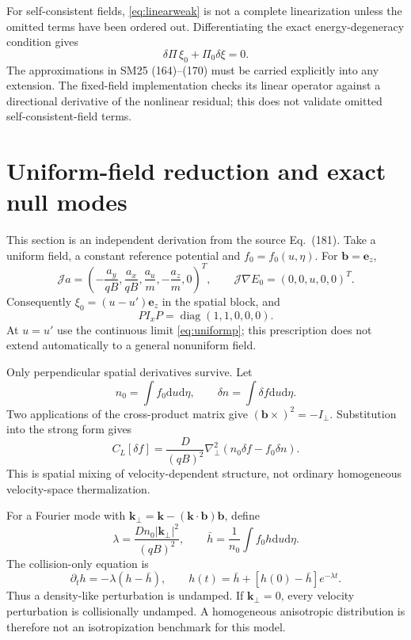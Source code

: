 \documentclass[11pt,letterpaper]{article}
\newcommand{\J}{\mathcal J}
\newcommand{\dd}{\mathrm d}
\newcommand{\diag}{\operatorname{diag}}
\begin{document}
For self-consistent fields, \eqref{eq:linearweak} is not a complete linearization
unless the omitted terms have been ordered out. Differentiating the exact
energy-degeneracy condition gives
\begin{equation}
 \delta\Pi\,\xi_0+\Pi_0\delta\xi=0.
 \label{eq:deltapi}
\end{equation}
The approximations in SM25 (164)--(170) must be carried explicitly into any
extension. The fixed-field implementation checks its linear operator against
a directional derivative of the nonlinear residual; this does not validate
omitted self-consistent-field terms.

\section{Uniform-field reduction and exact null modes}

This section is an independent derivation from the source Eq.~(181). Take a
uniform field, a constant reference potential and $f_0=f_0(u,\eta)$. For
$\bm b=\bm e_z$,
\begin{equation}
 \J a=\left(-\frac{a_y}{qB},\frac{a_x}{qB},
 \frac{a_u}{m},-\frac{a_z}{m},0\right)^T,
 \qquad \J\nabla E_0=(0,0,u,0,0)^T.
 \label{eq:uniformj}
\end{equation}
Consequently $\xi_0=(u-u')\bm e_z$ in the spatial block, and
\begin{equation}
 P I_xP=\diag(1,1,0,0,0).
 \label{eq:uniformp}
\end{equation}
At $u=u'$ use the continuous limit \eqref{eq:uniformp}; this prescription does not
extend automatically to a general nonuniform field.

Only perpendicular spatial derivatives survive. Let
\begin{equation}
 n_0=\int f_0\dd u\dd\eta,\qquad
 \delta n=\int\delta f\dd u\dd\eta.
\end{equation}
Two applications of the cross-product matrix give
$(\bm b\times)^2=-I_\perp$. Substitution into the strong form gives
\begin{equation}
 \boxed{C_L[\delta f]=\frac{D}{(qB)^2}\nabla_\perp^2
 (n_0\delta f-f_0\delta n).}
 \label{eq:uniformreduction}
\end{equation}
This is spatial mixing of velocity-dependent structure, not ordinary homogeneous
velocity-space thermalization.

For a Fourier mode with $\bm k_\perp=\bm k-(\bm k\cdot\bm b)\bm b$, define
\begin{equation}
 \lambda=\frac{Dn_0|\bm k_\perp|^2}{(qB)^2},\qquad
 \bar h=\frac{1}{n_0}\int f_0h\dd u\dd\eta.
\end{equation}
The collision-only equation is
\begin{equation}
 \partial_t h=-\lambda(h-\bar h),\qquad
 h(t)=\bar h+[h(0)-\bar h]e^{-\lambda t}.
 \label{eq:exactdecay}
\end{equation}
Thus a density-like perturbation is undamped. If $\bm k_\perp=0$, every velocity
perturbation is collisionally undamped. A homogeneous anisotropic distribution
is therefore not an isotropization benchmark for this model.
\end{document}
